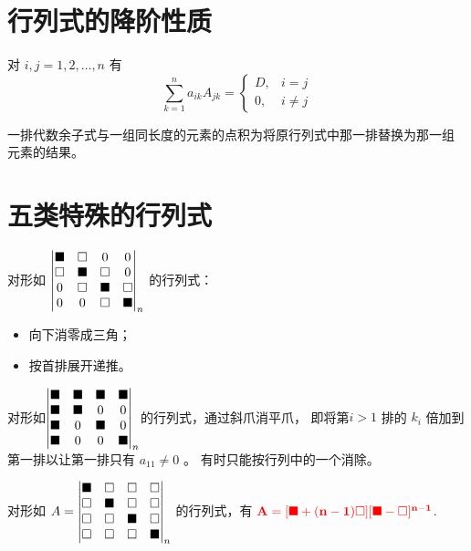 \section{行列式的降阶性质}

对 $ i,j = 1,2,\dots,n $ 有$$
    \sum_{k = 1}^n a_{ik}A_{jk}  =\begin{cases}
        D,& i = j\\0,& i\not=j
    \end{cases}
$$ 

一排代数余子式与一组同长度的元素的点积为将原行列式中那一排替换为那一组
元素的结果。

\section{五类特殊的行列式}


对形如 $ \begin{vmatrix}
    \blacksquare&\square &0 &0 \\
    \square&\blacksquare &\square &0 \\
    0&\square &\blacksquare &\square \\
    0&0 &\square &\blacksquare \\
\end{vmatrix}_n $ 的行列式：
\begin{itemize}
    \item 向下消零成三角；
    \item 按首排展开递推。
\end{itemize}


对形如$ \begin{vmatrix}
    \blacksquare&\blacksquare&\blacksquare&\blacksquare\\
    \blacksquare&\blacksquare&0&0\\
    \blacksquare&0&\blacksquare&0\\
    \blacksquare&0&0&\blacksquare\\
\end{vmatrix}_n $的行列式，\nextline 通过斜爪消平爪，
即将第$ i>1 $ 排的 $ k_i $ 倍加到第一排以让第一排只有 $ a_{11}\neq0 $ 。
有时只能按行列中的一个消除。


对形如
$ A = \begin{vmatrix}
    \blacksquare&\square&\square&\square\\
    \square&\blacksquare&\square&\square\\
    \square&\square&\blacksquare&\square\\
    \square&\square&\square&\blacksquare\\
\end{vmatrix}_n $ 的行列式，有 $
    \textcolor{red}{\bf{A = [\blacksquare+ (n-1)\square][\blacksquare-\square]^{n-1}}}
$.

